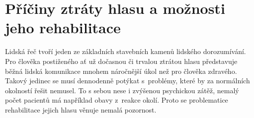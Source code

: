 \ifdefined\CELE
\else

\fi

\chapter{Příčiny ztráty hlasu a možnosti jeho rehabilitace}
\label{chap:cause}

Lidská řeč tvoří jeden ze základních stavebních kamenů lidského dorozumívání. Pro člověka
postiženého ať už dočasnou či trvalou ztrátou hlasu představuje běžná lidská
komunikace mnohem náročnější úkol než pro člověka zdravého. Takový jedinec se
musí dennodenně potýkat s~problémy, které by za normálních okolností řešit
nemusel. To s sebou nese %
i zvýšenou psychickou zátěž, nemalý počet pacientů má například obavy %
z~reakce okolí. Proto se problematice rehabilitace jejich
hlasu věnuje nemalá pozornost.



% 
% 

\ifdefined\CELE
\else

\fi
